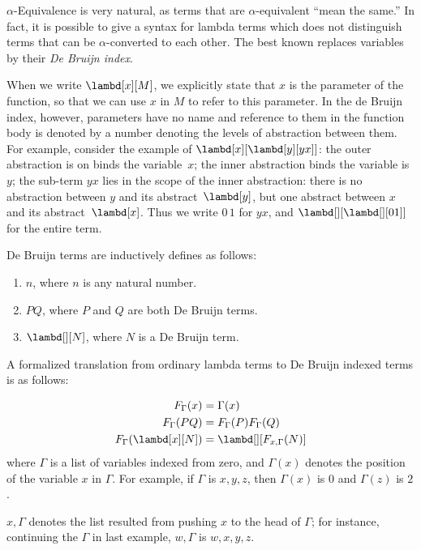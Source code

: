 \documentclass[../../../include/open-logic-section]{subfiles}
\begin{document}

$\alpha$-Equivalence is very natural, as terms that are
$\alpha$-equivalent ``mean the same.'' In fact, it is possible to give
a syntax for lambda terms which does not distinguish terms that can be
$\alpha$-converted to each other. The best known replaces variables by
their \emph{De Bruijn index}.

When we write $\lambd[x][M]$, we explicitly state that $x$ is the
parameter of the function, so that we can use $x$ in $M$ to refer to
this parameter. In the de Bruijn index, however, parameters have no
name and reference to them in the function body is denoted by a number
denoting the levels of abstraction between them. For example, consider
the example of $\lambd[x][\lambd[y][y x]]$: the outer abstraction is on
binds the variable~$x$; the inner abstraction binds the variable
is~$y$; the sub-term $y x$ lies in the scope of the inner abstraction:
there is no abstraction between $y$ and its abstract~$\lambd[y]$, but
one abstract between $x$ and its abstract~$\lambd[x]$. Thus we write
$0\, 1$ for $y x$, and $\lambd[][\lambd[][01]]$ for the entire term.

\begin{defn}
  De Bruijn terms are inductively defines as follows:
  \begin{enumerate}
  \item $n$, where $n$ is any natural number.
  \item $PQ$, where $P$ and $Q$ are both De Bruijn terms.
  \item $\lambd[][N]$, where $N$ is a De Bruijn term.
  \end{enumerate}
\end{defn}

A formalized translation from ordinary lambda terms to De Bruijn
indexed terms is as follows:
\begin{defn}
  \begin{align*}
    F_\Gamma(x) &= \Gamma(x) \\
    F_\Gamma(PQ) &= F_\Gamma(P)F_\Gamma(Q) \\
    F_\Gamma(\lambd[x][N]) &= \lambd[][F_{x,\Gamma}(N)]
  \end{align*}
  where $\Gamma$ is a list of variables indexed from zero, and
  $\Gamma(x)$ denotes the position of the variable $x$ in $\Gamma$.
  For example, if $\Gamma$ is $x,y,z$, then $\Gamma(x)$ is $0$ and
  $\Gamma(z)$ is $2$.
  
  $x,\Gamma$ denotes the list resulted from pushing $x$ to the head of
  $\Gamma$; for instance, continuing the $\Gamma$ in last example,
  $w,\Gamma$ is $w,x,y,z$.
\end{defn}
\end{document}
